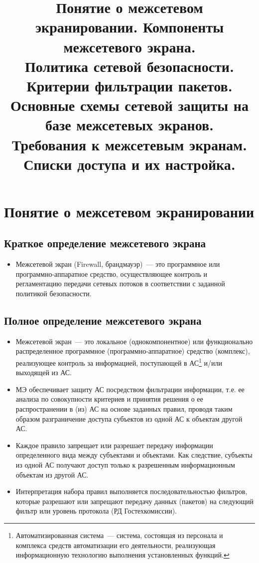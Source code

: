  

\title{\textbf{Понятие о межсетевом экранировании. Компоненты межсетевого экрана. \\ Политика сетевой безопасности. Критерии фильтрации пакетов. \\ Основные схемы сетевой защиты на базе межсетевых экранов. \\ Требования к межсетевым экранам. \\ Списки доступа и их настройка.}}	
\date{}


	\maketitle
	\thispagestyle{empty}
	\newpage
	\tableofcontents
	\newpage
	
	\section{Понятие о межсетевом экранировании}
	
	\subsection*{Краткое определение межсетевого экрана}
	\begin{itemize}
		\item 	Межсетевой экран (Firewall, брандмауэр)~--- это программное или программно-аппаратное средство, осуществляющее контроль и регламентацию передачи сетевых потоков в соответствии с заданной политикой безопасности.
	\end{itemize}
	
	\subsection*{Полное определение межсетевого экрана}
	\begin{itemize}
		\item Межсетевой экран~--- это локальное (однокомпонентное) или функционально распределенное программное (программно-аппаратное) средство (комплекс), реализующее контроль за информацией, поступающей в АС\footnote{Автоматизированная система~--- система, состоящая из персонала и комплекса средств автоматизации его деятельности, реализующая информационную технологию выполнения установленных функций.} и/или выходящей из АС.
		\item МЭ обеспечивает защиту АС посредством фильтрации информации, т.е. ее анализа по совокупности критериев и принятия решения о ее распространении в (из) АС на основе заданных правил, проводя таким образом разграничение доступа субъектов из одной АС к объектам другой АС.
		\item Каждое правило запрещает или разрешает передачу информации определенного вида между субъектами и объектами. Как следствие, субъекты из одной АС получают доступ только к разрешенным информационным объектам из другой АС.
		\item Интерпретация набора правил выполняется последовательностью фильтров, которые разрешают или запрещают передачу данных (пакетов) на следующий фильтр или уровень протокола (РД Гостехкомиссии).
	\end{itemize}
	
